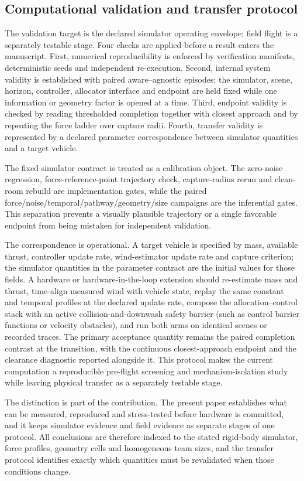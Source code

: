 \subsection{Computational validation and transfer protocol}

The validation target is the declared simulator operating envelope; field
flight is a separately testable stage. Four checks are applied before a result
enters the manuscript. First, numerical reproducibility is enforced by
verification manifests, deterministic seeds and independent re-execution.
Second, internal system validity is established with paired
aware--agnostic episodes: the simulator, scene, horizon, controller, allocator
interface and endpoint are held fixed while one information or geometry factor
is opened at a time. Third, endpoint validity is checked by reading thresholded
completion together with closest approach and by repeating the force ladder over
capture radii. Fourth, transfer validity is represented by a declared parameter
correspondence between simulator quantities and a target vehicle.

The fixed simulator contract is treated as a calibration object. The zero-noise
regression, force-reference-point trajectory check, capture-radius rerun and
clean-room rebuild are implementation gates, while the paired
force/noise/temporal/pathway/geometry/size campaigns are the inferential gates.
This separation prevents a visually plausible trajectory or a single favorable
endpoint from being mistaken for independent validation.

The correspondence is operational. A target vehicle is specified by mass,
available thrust, controller update rate, wind-estimator update rate and capture
criterion; the simulator quantities in the parameter contract are the initial
values for those fields. A hardware or hardware-in-the-loop extension should
re-estimate mass and thrust, time-align measured wind with vehicle state, replay
the same constant and temporal profiles at the declared update rate, compose the
allocation--control stack with an active collision-and-downwash safety barrier
(such as control barrier functions or velocity obstacles), and run
both arms on identical scenes or recorded traces. The primary acceptance
quantity remains the paired completion contrast at the transition, with the
continuous closest-approach endpoint and the clearance diagnostic reported
alongside it. This protocol makes the current computation a reproducible
pre-flight screening and mechanism-isolation study while leaving physical
transfer as a separately testable stage.

The distinction is part of the contribution. The present paper establishes what
can be measured, reproduced and stress-tested before hardware is committed, and
it keeps simulator evidence and field evidence as separate stages of one
protocol. All conclusions are therefore indexed to the stated rigid-body
simulator, force profiles, geometry cells and homogeneous team sizes, and the
transfer protocol identifies exactly which quantities must be revalidated when
those conditions change.
